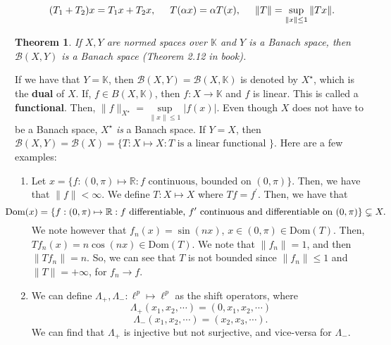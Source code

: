 \documentclass[12pt]{article}
\newtheorem{theorem}{Theorem}
\newcommand{\R}{{\mathbb R}}
\def\K{\mathbb{K}}
\newcommand{\B}{\mathscr{B}}
\newcommand{\pr}{\prime}
\newcommand{\Xs}{X^{\star}}
\begin{document}
\[ (T_1 + T_2)x = T_1 x + T_2 x, \hspace{5mm} T(\alpha x) = \alpha T(x), \hspace{5mm} \| T \| = \sup\limits_{\| x \| \leq 1 } \| Tx\|. \]
\begin{theorem}
If $X, Y$ are normed spaces over $\K$ and $Y$ is a Banach space, then $\B(X, Y)$ is a Banach space (Theorem 2.12 in book).
\end{theorem}
\vspace{-20pt}
If we have that $Y = \K$, then $\B(X, Y) = \B(X, \K)$ is denoted by $\Xs$, which is the \textbf{dual} of $X$. If, $f \in B(X, \K)$, then $f: X \to \K$ and $f$ is linear. This is called a \textbf{functional}. Then, $\| f \|_{\Xs} = \sup\limits_{\| x \| \leq 1} |f(x)|$. Even though $X$ does not have to be a Banach space, $\Xs$ \textit{is} a Banach space. If $Y = X$, then $\B(X, Y) = \B(X)  = \{ T: X \mapsto X : T \text{ is a linear functional } \}$. Here are a few examples:
\begin{enumerate}[topsep=-15pt]
\item Let $x = \{ f: (0, \pi) \mapsto \R : f \text{ continuous, bounded on } (0, \pi) \}$. Then, we have that $\|f \| < \infty$. We define $T: X \mapsto X$ where $Tf = f^{\pr}$. Then, we have that 
\[ \hspace{-10mm} \text{Dom}(x) = \{ f: (0, \pi) \mapsto \R : f \text{ differentiable, } f^{\pr} \text{ continuous and differentiable on } (0, \pi) \} \subsetneq X.\]
We note however that $f_n(x) = \sin(nx)$, $x \in (0, \pi) \in \text{Dom}(T)$. Then, $Tf_n(x) = n\cos(nx) \in \text{Dom}(T)$. We note that $\| f_n \| = 1$, and then $\| Tf_n \| = n$. So, we can see that $T$ is not bounded since $\| f_n \| \leq 1$ and   $\|T \| = + \infty$, for $f_n \to f$. 
\item We can define $\Lambda_+, \Lambda_- : \ell^p \mapsto \ell^p$ as the shift operators, where 
\[ \Lambda_+(x_1, x_2, \cdots) = (0, x_1, x_2, \cdots)\]
\[ \Lambda_-(x_1, x_2, \cdots) = (x_2,  x_3, \cdots).\]
We can find that $\Lambda_+$ is injective but not surjective, and vice-versa for $\Lambda_-$.
\end{enumerate}
\end{document}
